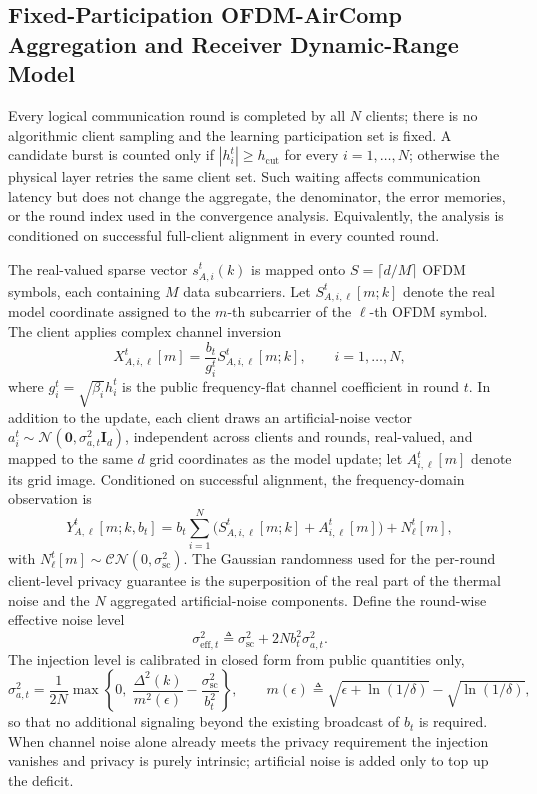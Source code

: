 \documentclass[journal]{IEEEtran}
\begin{document}
\subsection{Fixed-Participation OFDM-AirComp Aggregation and Receiver Dynamic-Range Model}

Every logical communication round is completed by all $N$ clients; there is no algorithmic client sampling and the learning participation set is fixed. A candidate burst is counted only if $|h_i^t|\ge h_{\mathrm{cut}}$ for every $i=1,\ldots,N$; otherwise the physical layer retries the same client set. Such waiting affects communication latency but does not change the aggregate, the denominator, the error memories, or the round index used in the convergence analysis. Equivalently, the analysis is conditioned on successful full-client alignment in every counted round.

The real-valued sparse vector $s_{A,i}^t(k)$ is mapped onto $S=\lceil d/M\rceil$ OFDM symbols, each containing $M$ data subcarriers. Let $S_{A,i,\ell}^t[m;k]$ denote the real model coordinate assigned to the $m$-th subcarrier of the $\ell$-th OFDM symbol. The client applies complex channel inversion
\begin{equation}
    X_{A,i,\ell}^t[m]
    =\frac{b_t}{g_i^t}S_{A,i,\ell}^t[m;k],
    \qquad i=1,\ldots,N,
\end{equation}
where $g_i^t=\sqrt{\beta_i}h_i^t$ is the public frequency-flat channel coefficient in round $t$. In addition to the update, each client draws an artificial-noise vector $a_i^t\sim\mathcal N(\mathbf 0,\sigma_{a,t}^2\mathbf I_d)$, independent across clients and rounds, real-valued, and mapped to the same $d$ grid coordinates as the model update; let $A_{i,\ell}^t[m]$ denote its grid image. Conditioned on successful alignment, the frequency-domain observation is
\begin{equation}
    Y_{A,\ell}^t[m;k,b_t]
    =b_t\sum_{i=1}^{N}\big(S_{A,i,\ell}^t[m;k]+A_{i,\ell}^t[m]\big)+N_\ell^t[m],
\end{equation}
with $N_\ell^t[m]\sim\mathcal{CN}(0,\sigma_{\mathrm{sc}}^2)$. The Gaussian randomness used for the per-round client-level privacy guarantee is the superposition of the real part of the thermal noise and the $N$ aggregated artificial-noise components. Define the round-wise effective noise level
\begin{equation}
    \label{eqn:effective_noise}
    \sigma_{\mathrm{eff},t}^2\triangleq\sigma_{\mathrm{sc}}^2+2N b_t^2\sigma_{a,t}^2 .
\end{equation}
The injection level is calibrated in closed form from public quantities only,
\begin{equation}
    \label{eqn:artificial_noise_calibration}
    \sigma_{a,t}^2=\frac{1}{2N}\max\!\left\{0,\;
    \frac{\Delta^2(k)}{m^2(\epsilon)}-\frac{\sigma_{\mathrm{sc}}^2}{b_t^2}\right\},
    \qquad
    m(\epsilon)\triangleq\sqrt{\epsilon+\ln(1/\delta)}-\sqrt{\ln(1/\delta)},
\end{equation}
so that no additional signaling beyond the existing broadcast of $b_t$ is required. When channel noise alone already meets the privacy requirement the injection vanishes and privacy is purely intrinsic; artificial noise is added only to top up the deficit.
\end{document}
